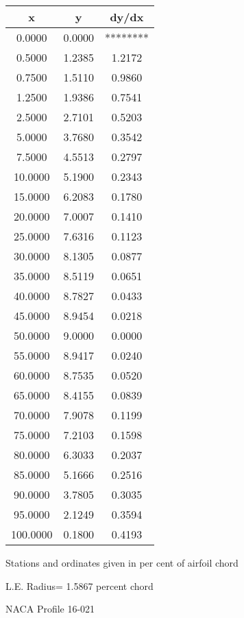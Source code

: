 \documentclass[11pt]{book}
\begin{document}
 \vspace{8mm}
 \begin{tabular}{|c|c|c|} \hline 
  x  &  y  &  dy/dx \\
 \hline
0.0000 & 0.0000 & ******** \\
0.5000 & 1.2385 & 1.2172 \\
0.7500 & 1.5110 & 0.9860 \\
1.2500 & 1.9386 & 0.7541 \\
2.5000 & 2.7101 & 0.5203 \\
5.0000 & 3.7680 & 0.3542 \\
7.5000 & 4.5513 & 0.2797 \\
10.0000 & 5.1900 & 0.2343 \\
15.0000 & 6.2083 & 0.1780 \\
20.0000 & 7.0007 & 0.1410 \\
25.0000 & 7.6316 & 0.1123 \\
30.0000 & 8.1305 & 0.0877 \\
35.0000 & 8.5119 & 0.0651 \\
40.0000 & 8.7827 & 0.0433 \\
45.0000 & 8.9454 & 0.0218 \\
50.0000 & 9.0000 & 0.0000 \\
55.0000 & 8.9417 & 0.0240 \\
60.0000 & 8.7535 & 0.0520 \\
65.0000 & 8.4155 & 0.0839 \\
70.0000 & 7.9078 & 0.1199 \\
75.0000 & 7.2103 & 0.1598 \\
80.0000 & 6.3033 & 0.2037 \\
85.0000 & 5.1666 & 0.2516 \\
90.0000 & 3.7805 & 0.3035 \\
95.0000 & 2.1249 & 0.3594 \\
100.0000 & 0.1800 & 0.4193 \\
 \hline
 \end{tabular}
 \vspace{8mm}


Stations and ordinates given in per cent of airfoil chord 


L.E. Radius=  1.5867 percent chord
 \newpage
  \label{p16-021}
 \begin{Large}
 NACA Profile 16-021
 \end{Large}
  
\end{document}
